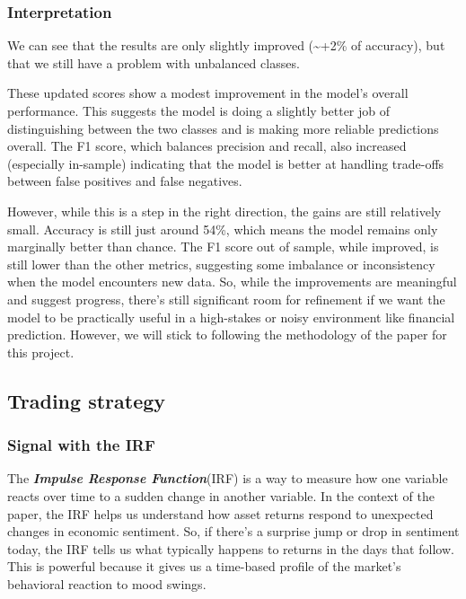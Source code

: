 \documentclass[
  a4paper]{article}
\begin{document}
\hypertarget{interpretation-1}{%
\subsubsection{Interpretation}\label{interpretation-1}}

We can see that the results are only slightly improved
(\textasciitilde+2\% of accuracy), but that we still have a problem with
unbalanced classes.

These updated scores show a modest improvement in the model's overall
performance. This suggests the model is doing a slightly better job of
distinguishing between the two classes and is making more reliable
predictions overall. The F1 score, which balances precision and recall,
also increased (especially in-sample) indicating that the model is
better at handling trade-offs between false positives and false
negatives.

However, while this is a step in the right direction, the gains are
still relatively small. Accuracy is still just around 54\%, which means
the model remains only marginally better than chance. The F1 score out
of sample, while improved, is still lower than the other metrics,
suggesting some imbalance or inconsistency when the model encounters new
data. So, while the improvements are meaningful and suggest progress,
there's still significant room for refinement if we want the model to be
practically useful in a high-stakes or noisy environment like financial
prediction. However, we will stick to following the methodology of the
paper for this project.

\hypertarget{trading-strategy}{%
\subsection{Trading strategy}\label{trading-strategy}}

\hypertarget{signal-with-the-irf}{%
\subsubsection{Signal with the IRF}\label{signal-with-the-irf}}

The \textbf{\emph{Impulse Response Function}}(IRF) is a way to measure
how one variable reacts over time to a sudden change in another
variable. In the context of the paper, the IRF helps us understand how
asset returns respond to unexpected changes in economic sentiment. So,
if there's a surprise jump or drop in sentiment today, the IRF tells us
what typically happens to returns in the days that follow. This is
powerful because it gives us a time-based profile of the market's
behavioral reaction to mood swings.
\end{document}

